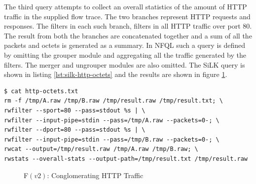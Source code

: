 The third query attempts to collect an overall statistics of the amount of
HTTP traffic in the supplied flow trace. The two branches represent HTTP
requests and responses. The filters in each such branch, filters in all HTTP
traffic over port $80$. The result from both the branches are
 concatenated together and a sum of all
the packets and octets is generated as a summary. In NFQL such a query is
defined by omitting the grouper module and aggregating all the traffic
generated by the filters.  The merger and ungrouper modules are also omitted.
The SiLK query is shown in listing \ref{lst:silk-http-octets} and the results
are shown in figure \ref{fig:summarizing-http-octets}.


\begin{lstlisting}
$ cat http-octets.txt
rm -f /tmp/A.raw /tmp/B.raw /tmp/result.raw /tmp/result.txt; \
rwfilter --sport=80 --pass=stdout %s | \
rwfilter --input-pipe=stdin --pass=/tmp/A.raw --packets=0-; \
rwfilter --dport=80 --pass=stdout %s | \
rwfilter --input-pipe=stdin --pass=/tmp/B.raw --packets=0-; \
rwcat --output=/tmp/result.raw /tmp/A.raw /tmp/B.raw; \
rwstats --overall-stats --output-path=/tmp/result.txt /tmp/result.raw
\end{lstlisting}

\begin{figure}[ht!]
\centering
{}\quad
\caption{F$(v2)$: Conglomerating HTTP Traffic}
\label{fig:summarizing-http-octets}
\end{figure}






